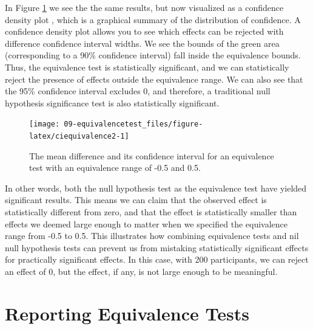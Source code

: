 \documentclass[
  oneside]{book}
\begin{document}
In Figure \ref{fig:ciequivalence2} we see the the same results, but now visualized as a confidence density plot \citep{schweder_confidence_2016}, which is a graphical summary of the distribution of confidence. A confidence density plot allows you to see which effects can be rejected with difference confidence interval widths. We see the bounds of the green area (corresponding to a 90\% confidence interval) fall inside the equivalence bounds. Thus, the equivalence test is statistically significant, and we can statistically reject the presence of effects outside the equivalence range. We can also see that the 95\% confidence interval excludes 0, and therefore, a traditional null hypothesis significance test is also statistically significant.

\begin{figure}

{\centering \texttt{[image: 09-equivalencetest\_files/figure-latex/ciequivalence2-1]} 

}

\caption{The mean difference and its confidence interval for an equivalence test with an equivalence range of -0.5 and 0.5.}\label{fig:ciequivalence2}
\end{figure}

In other words, both the null hypothesis test as the equivalence test have yielded significant results. This means we can claim that the observed effect is statistically different from zero, and that the effect is statistically smaller than effects we deemed large enough to matter when we specified the equivalence range from -0.5 to 0.5. This illustrates how combining equivalence tests and nil null hypothesis tests can prevent us from mistaking statistically significant effects for practically significant effects. In this case, with 200 participants, we can reject an effect of 0, but the effect, if any, is not large enough to be meaningful.

\hypertarget{reporting-equivalence-tests}{%
\section{Reporting Equivalence Tests}\label{reporting-equivalence-tests}}
\end{document}
